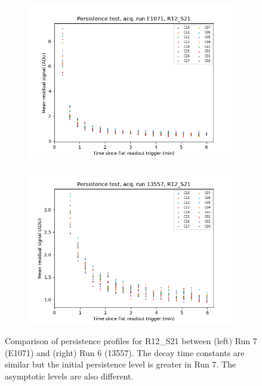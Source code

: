 \begin{figure}
\centering
\begin{subfigure}{0.5\textwidth}
  \centering
  \includegraphics[width=1.0\textwidth]{sections/figures/baselineCharacterization/persistence_plot_LSSTCam_R12_S21_u_lsstccs_eo_persistence_E1071_w_2024_35_20240925T180602Z.png}
\end{subfigure}%
\begin{subfigure}{0.5\textwidth}
  \centering
  \includegraphics[width=1\textwidth]{sections/figures/baselineCharacterization/persistence_plot_LSSTCam_R12_S21_u_lsstccs_eo_persistence_13557_w_2023_41_20231118T050437Z.png}
\end{subfigure}
\caption{Comparison of persistence profiles for R12\_S21 between (left) Run 7 (E1071) and (right) Run 6 (13557).  The decay time constants are similar but the initial persistence level is greater in Run 7.  The asymptotic levels are also different.}
\label{fig:persistence-decay-comp}
\end{figure}

